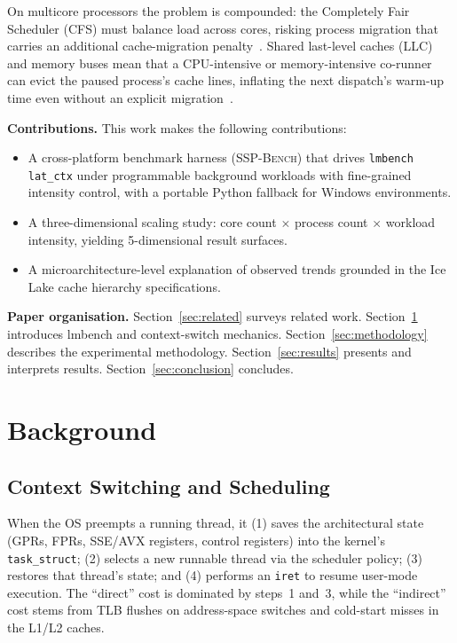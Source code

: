 \documentclass[conference]{IEEEtran}
\begin{document}
On multicore processors the problem is compounded: the Completely Fair
Scheduler (CFS) must balance load across cores, risking process migration that
carries an additional cache-migration penalty~\cite{lozi2016linux}.  Shared
last-level caches (LLC) and memory buses mean that a CPU-intensive or
memory-intensive co-runner can evict the paused process's cache lines,
inflating the next dispatch's warm-up time even without an explicit
migration~\cite{blagodurov2011numa}.

\textbf{Contributions.}  This work makes the following contributions:
\begin{itemize}
  \item A cross-platform benchmark harness (\textsc{SSP-Bench}) that drives
        \texttt{lmbench lat\_ctx} under programmable background workloads with
        fine-grained intensity control, with a portable Python fallback for
        Windows environments.
  \item A three-dimensional scaling study: core count $\times$ process count
        $\times$ workload intensity, yielding 5-dimensional result surfaces.
  \item A microarchitecture-level explanation of observed trends grounded in
        the Ice Lake cache hierarchy specifications.
\end{itemize}

\textbf{Paper organisation.}
Section~\ref{sec:related} surveys related work.
Section~\ref{sec:background} introduces lmbench and context-switch mechanics.
Section~\ref{sec:methodology} describes the experimental methodology.
Section~\ref{sec:results} presents and interprets results.
Section~\ref{sec:conclusion} concludes.

\section{Background}
\label{sec:background}

\subsection{Context Switching and Scheduling}
When the OS preempts a running thread, it (1) saves the architectural state
(GPRs, FPRs, SSE/AVX registers, control registers) into the kernel's
\texttt{task\_struct}; (2) selects a new runnable thread via the scheduler
policy; (3) restores that thread's state; and (4) performs an \texttt{iret}
to resume user-mode execution.  The ``direct'' cost is dominated by steps~1
and~3, while the ``indirect'' cost stems from TLB flushes on address-space
switches and cold-start misses in the L1/L2 caches.
\end{document}
